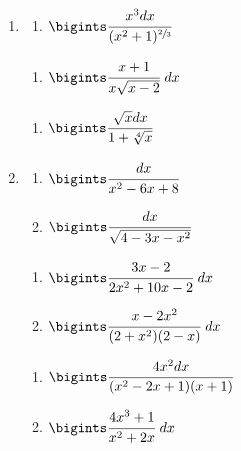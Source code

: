 \documentclass{article}
\begin{document}
\begin{multicols}{2}
\begin{enumerate}[label=\Roman*.]
		\item
		\begin{multicols}{3}
			\begin{enumerate}[label=\arabic*.]
				\setlength\itemsep{1em}
				\item $\bigints \cfrac{x^3dx}{(x^2+1)^{\sfrac{2}{3}}}$
			\end{enumerate}
			\vfill\null\columnbreak
			\begin{enumerate}[label=\arabic*., start=2]
				\setlength\itemsep{1em}
				\item $\bigints\cfrac{x+1}{x\sqrt{x-2}}\ dx$
			\end{enumerate}
			\vfill\null\columnbreak
			\begin{enumerate}[label=\arabic*., start=3]
				\setlength\itemsep{1em}
				\item $\bigints\cfrac{\sqrt{x}dx}{1+\sqrt[4]{x}}$
			\end{enumerate}
			\vfill\null\columnbreak
		\end{multicols}
		
		\item
		\begin{multicols}{3}
			\begin{enumerate}[label=\arabic*.]
				\setlength\itemsep{1em}
				\item $\bigints\cfrac{dx}{x^2 - 6x + 8}$
				\item $\bigints\cfrac{dx}{\sqrt{4 - 3x - x^2}}$
			\end{enumerate}
			\vfill\null\columnbreak
			\begin{enumerate}[label=\arabic*., start=3]
				\setlength\itemsep{1em}
				\item $\bigints\cfrac{3x-2}{2x^2+10x-2}\ dx$
				\item $\bigints\cfrac{x-2x^2}{(2+x^2)(2-x)}\ dx$
			\end{enumerate}
			\vfill\null\columnbreak
			\begin{enumerate}[label=\arabic*., start=5]
				\setlength\itemsep{1em}
				\item $\bigints\cfrac{4x^2dx}{(x^2-2x+1)(x+1)}$
				\item $\bigints\cfrac{4x^3+1}{x^2 + 2x}\ dx$
			\end{enumerate}
			\vfill\null\columnbreak
		\end{multicols}
		

\end{enumerate}
\end{multicols}
\end{document}
